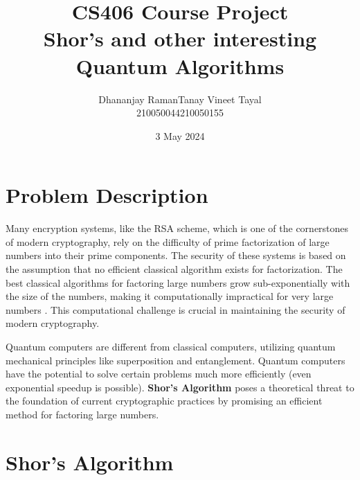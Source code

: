 \documentclass[12pt]{article}
\begin{document}
\title{CS406 Course Project \\ \textbf{Shor's and other interesting Quantum Algorithms}}
\author{Dhananjay Raman\hspace{3.5cm}Tanay Vineet Tayal \\ 210050044\hspace{5.7cm}210050155}
\date{3 May 2024}

\maketitle
\tableofcontents
\section{Problem Description}
Many encryption systems, like the RSA scheme, which is one of the cornerstones of modern cryptography, rely on the difficulty of prime factorization of large numbers into their prime components\cite{rsa}. The security of these systems is based on the assumption that no efficient classical algorithm exists for factorization. The best classical algorithms for factoring large numbers grow sub-exponentially with the size of the numbers, making it computationally impractical for very large numbers \cite{classical}. This computational challenge is crucial in maintaining the security of modern cryptography.
\par\noindent Quantum computers are different from classical computers, utilizing quantum mechanical principles like superposition and entanglement. Quantum computers have the potential to solve certain problems much more efficiently (even exponential speedup is possible). \textbf{Shor's Algorithm} \cite{shor} poses a theoretical threat to the foundation of current cryptographic practices by promising an efficient method for factoring large numbers.

\section{Shor's Algorithm}
\end{document}
